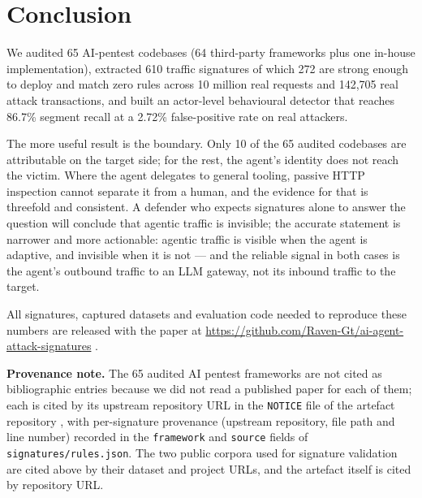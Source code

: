 \documentclass[11pt]{article}
\begin{document}
\section{Conclusion}
\label{sec:conclusion}

We audited 65 AI-pentest codebases (64 third-party frameworks plus one in-house
implementation), extracted 610 traffic signatures of which 272 are strong enough to deploy and
match zero rules across 10 million real requests and 142,705 real attack transactions, and
built an actor-level behavioural detector that reaches 86.7\% segment recall at a 2.72\%
false-positive rate on real attackers.

The more useful result is the boundary. Only 10 of the 65 audited codebases are attributable on
the target side; for the rest, the agent's identity does not reach the victim. Where the agent
delegates to general tooling, passive HTTP inspection cannot separate it from a human, and the
evidence for that is threefold and consistent. A defender who expects signatures alone to
answer the question will conclude that agentic traffic is invisible; the accurate statement is
narrower and more actionable: agentic traffic is visible when the agent is adaptive, and
invisible when it is not --- and the reliable signal in both cases is the agent's outbound
traffic to an LLM gateway, not its inbound traffic to the target.

All signatures, captured datasets and evaluation code needed to reproduce these numbers are
released with the paper at \url{https://github.com/Raven-Gt/ai-agent-attack-signatures}
\cite{aasrepo}.




\noindent\textbf{Provenance note.} The 65 audited AI pentest frameworks are not cited as
bibliographic entries because we did not read a published paper for each of them; each is
cited by its upstream repository URL in the \texttt{NOTICE} file of the artefact repository
\cite{aasrepo}, with per-signature provenance (upstream repository, file path and line
number) recorded in the \texttt{framework} and \texttt{source} fields of
\texttt{signatures/rules.json}. The two public corpora used for signature validation are
cited above by their dataset and project URLs, and the artefact itself is cited by
repository URL.
\end{document}
